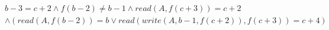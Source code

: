 \begin{align*}
%
& %
b - 3 = c + 2
%
\land
%
f(b - 2)  \neq  b - 1
%
\land
%
\mathit{read}(A,f(c + 3)) = c + 2
~\\~
& %
%
\land
%
(\mathit{read}(A,f(b - 2)) = b \lor \mathit{read}(\mathit{write}(A,b - 1,f(c + 2)),f(c + 3)) = c + 4)
%
\end{align*}
